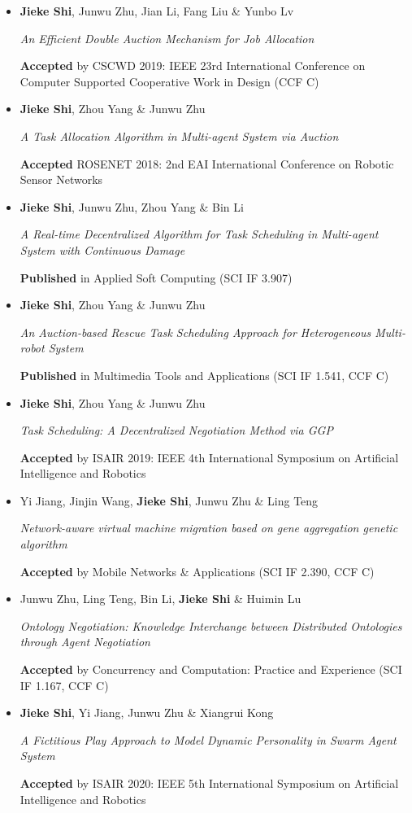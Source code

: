 \documentclass[zh]{resume}
\begin{document}
\begin{itemize}
  \small
  \item \textbf{Jieke Shi}, Junwu Zhu, Jian Li, Fang Liu \& Yunbo Lv\par
   \textit{An Efficient Double Auction Mechanism for Job Allocation}\par
    \textbf{Accepted} by CSCWD 2019: IEEE 23rd International Conference on Computer Supported Cooperative Work in Design 
    (CCF C)
  \item \textbf{Jieke Shi}, Zhou Yang \& Junwu Zhu\par
    \textit{A Task Allocation Algorithm in Multi-agent System via Auction}\par
    \textbf{Accepted}  ROSENET 2018: 2nd EAI International Conference on Robotic Sensor Networks
 \item \textbf{Jieke Shi}, Junwu Zhu, Zhou Yang \& Bin Li\par
    \textit{A Real-time Decentralized Algorithm for Task Scheduling in Multi-agent System with Continuous Damage}\par
    \textbf{Published} in Applied Soft Computing (SCI IF 3.907)
 \item \textbf{Jieke Shi}, Zhou Yang \& Junwu Zhu\par
    \textit{An Auction-based Rescue Task Scheduling Approach for Heterogeneous Multi-robot System}\par
    \textbf{Published} in Multimedia Tools and Applications (SCI IF 1.541, CCF C)
 \item \textbf{Jieke Shi}, Zhou Yang \& Junwu Zhu\par
    \textit{Task Scheduling: A Decentralized Negotiation Method via GGP}\par
    \textbf{Accepted} by ISAIR 2019: IEEE 4th International Symposium on Artificial Intelligence and Robotics
 \item Yi Jiang, Jinjin Wang, \textbf{Jieke Shi}, Junwu Zhu \& Ling Teng\par
    \textit{Network-aware virtual machine migration based on gene aggregation genetic algorithm}\par
    \textbf{Accepted} by Mobile Networks \& Applications (SCI IF 2.390, CCF C)
 \item Junwu Zhu, Ling Teng, Bin Li, \textbf{Jieke Shi} \& Huimin Lu\par
   \textit{Ontology Negotiation: Knowledge Interchange between Distributed Ontologies through Agent Negotiation}\par
    \textbf{Accepted} by Concurrency and Computation: Practice and Experience (SCI IF 1.167, CCF C)
 \item \textbf{Jieke Shi}, Yi Jiang, Junwu Zhu \& Xiangrui Kong\par
    \textit{A Fictitious Play Approach to Model Dynamic Personality in Swarm Agent System}\par
    \textbf{Accepted} by ISAIR 2020: IEEE 5th International Symposium on Artificial Intelligence and Robotics
\end{itemize}
\end{document}
